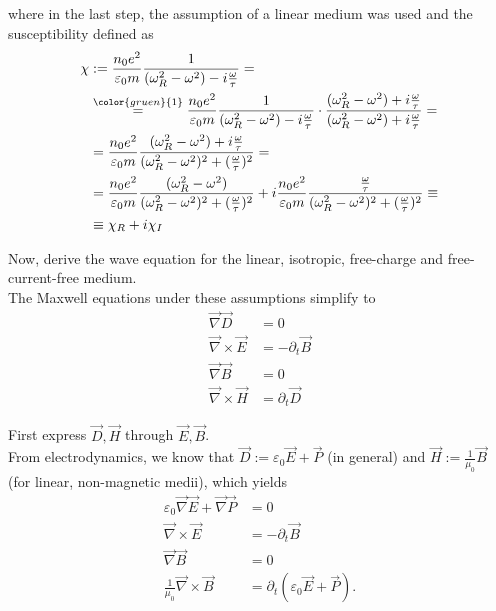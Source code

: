 \documentclass{article}
\newcommand{\comment}[1]{{\color{gruen} {#1}}}
\begin{document}
{	where in the last step, the assumption of a linear medium was used and the susceptibility defined as
		\begin{align*}
			\chi &:= \frac{n_0 e^2}{\varepsilon_0 m} \frac{1}{ (\omega_R^2 - \omega^2) - i\frac{\omega}{\tau} } = \\
			&\stackrel{\comment{1}}{=} \frac{n_0 e^2}{\varepsilon_0 m} \frac{1}{ (\omega_R^2 - \omega^2) - i\frac{\omega}{\tau} } \cdot \frac{ (\omega_R^2 - \omega^2) + i\frac{\omega}{\tau} }{ (\omega_R^2 - \omega^2) + i\frac{\omega}{\tau} } = \\
			&= \frac{n_0 e^2}{\varepsilon_0 m} \frac{ (\omega_R^2 - \omega^2) + i\frac{\omega}{\tau} }{ (\omega_R^2 - \omega^2)^2 + (\frac{\omega}{\tau})^2 } = \\
			&= \frac{n_0 e^2}{\varepsilon_0 m} \frac{ (\omega_R^2 - \omega^2)}{ (\omega_R^2 - \omega^2)^2 + (\frac{\omega}{\tau})^2 } + i\frac{n_0 e^2}{\varepsilon_0 m} \frac{\frac{\omega}{\tau} }{ (\omega_R^2 - \omega^2)^2 + (\frac{\omega}{\tau})^2 } \equiv \\
			&\equiv \chi_R + i \chi_I
		\end{align*}


\newpage


	Now, derive the wave equation for the linear, isotropic, free-charge and free-current-free medium.\\
	The Maxwell equations under these assumptions simplify to
		\begin{align*}
			\vec{\nabla} \vec{D} &= 0 \\
			\vec{\nabla} \times \vec{E} &= -\partial_t \vec{B} \\
			\vec{\nabla} \vec{B} &= 0 \\
			\vec{\nabla} \times \vec{H} &= \partial_t \vec{D}
		\end{align*}

	First express $\vec{D}, \vec{H}$ through $\vec{E}, \vec{B}$.\\
	From electrodynamics, we know that $\vec{D} := \varepsilon_0\vec{E} + \vec{P}$ \textcolor{gruen}{(in general)} and $\vec{H} := \frac{1}{\mu_0}\vec{B}$ \textcolor{gruen}{(for linear, non-magnetic medii)}, which yields
		\begin{align*}
			\varepsilon_0\vec{\nabla} \vec{E} + \vec{\nabla}\vec{P} &= 0 \\
			\vec{\nabla} \times \vec{E} &= -\partial_t \vec{B} \\
			\vec{\nabla} \vec{B} &= 0 \\
			\frac{1}{\mu_0}\vec{\nabla} \times \vec{B} &= \partial_t (\varepsilon_0 \vec{E} + \vec{P}).
		\end{align*}
	
}
\end{document}
